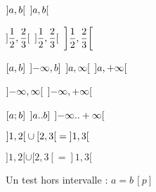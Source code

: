 \documentclass[varwidth, border = 3pt]{standalone}
\begin{document}
$\intervalO{a, b}$
\quad
$\intervalO[big]{a, b}$

$\intervalO{\dfrac{1}{2}, \dfrac{2}{3}}$
\quad
$\intervalO[Big]{\dfrac{1}{2}, \dfrac{2}{3}}$
\quad
$\intervalO*{\dfrac{1}{2}, \dfrac{2}{3}}$

$\intervalC{a, b}$
\quad
$\intervalOC{-\infty, b}$
\quad
$\intervalO{a, \infty}$
\quad
$\intervalO{a, +\infty}$

$\intervalO{-\infty, \infty}$
\quad
$\intervalO{-\infty, +\infty}$

$\intervalC{a ; b}$
\quad
$\intervalOC{a .. b}$
\quad
$\intervalO{-\infty .. +\infty}$

$\intervalO{1, 2} \cup \intervalCO{2, 3} = \intervalO{1, 3}$

$]1, 2[ \cup [2, 3[ = ]1, 3[$

Un test hors intervalle : $a = b \, [p]$
\end{document}
